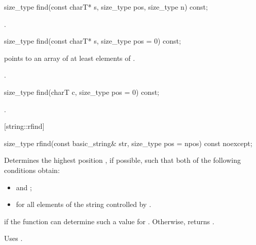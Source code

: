 %
%
\begin{itemdecl}
size_type find(const charT* s, size_type pos, size_type n) const;
\end{itemdecl}

\begin{itemdescr}
\pnum
\returns
{}.
\end{itemdescr}

%
%
\begin{itemdecl}
size_type find(const charT* s, size_type pos = 0) const;
\end{itemdecl}

\begin{itemdescr}
\pnum
\requires {} points to an array of at least 
elements of .

\pnum
\returns
{}.
\end{itemdescr}

%
%
\begin{itemdecl}
size_type find(charT c, size_type pos = 0) const;
\end{itemdecl}

\begin{itemdescr}
\pnum
\returns
{}.
\end{itemdescr}

[string::rfind]{}

%
%
\begin{itemdecl}
size_type rfind(const basic_string& str,
                size_type pos = npos) const noexcept;
\end{itemdecl}

\begin{itemdescr}
\pnum
\effects
Determines the highest position , if possible, such that both of
the following conditions obtain:

\begin{itemize}
\item
{}
and
;
\item
{}%
for all elements  of the string controlled by .
\end{itemize}

\pnum
\returns
{} if the function can determine such a value for .
Otherwise, returns
.

\pnum
\notes
Uses
.
\end{itemdescr}

